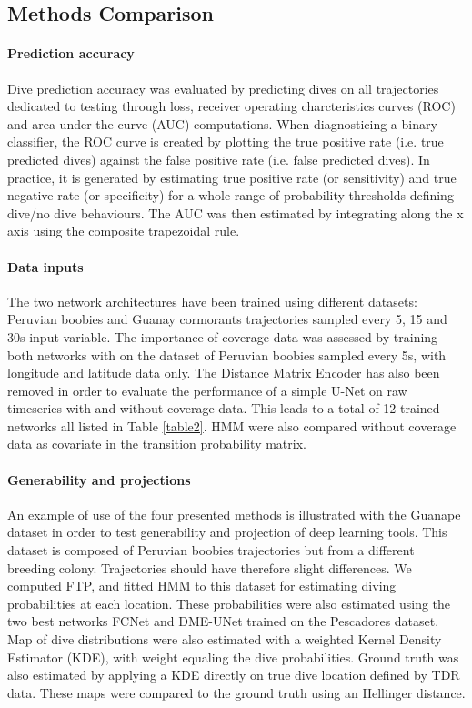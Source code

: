 \documentclass{article}
\begin{document}
\subsection{Methods Comparison}
\paragraph{Prediction accuracy}
Dive prediction accuracy was evaluated by predicting dives on all trajectories dedicated to testing through loss, receiver operating charcteristics curves (ROC) and area under the curve (AUC) computations.
When diagnosticing a binary classifier, the ROC curve is created by plotting the true positive rate (i.e. true predicted dives) against the false positive rate (i.e. false predicted dives).
In practice, it is generated by estimating true positive rate (or sensitivity) and true negative rate (or specificity) for a whole range of probability thresholds defining dive/no dive behaviours.
The AUC was then estimated by integrating along the x axis using the composite trapezoidal rule.

\paragraph{Data inputs}
The two network architectures have been trained using different datasets: Peruvian boobies and Guanay cormorants trajectories sampled every 5, 15 and 30s  input variable.
The importance of coverage data was assessed by training both networks with on the dataset of Peruvian boobies sampled every 5s, with longitude and latitude data only.
The Distance Matrix Encoder has also been removed in order to evaluate the performance of a simple U-Net on raw timeseries with and without coverage data.
This leads to a total of 12 trained networks all listed in Table \ref{table2}.
HMM were also compared without coverage data as covariate in the transition probability matrix.

\paragraph{Generability and projections}
An example of use of the four presented methods is illustrated with the Guanape dataset in order to test generability and projection of deep learning tools. This dataset is composed of Peruvian boobies trajectories but from a different breeding colony.
Trajectories should have therefore slight differences.
We computed FTP, and fitted HMM to this dataset for estimating diving probabilities at each location. These probabilities were also estimated using the two best networks FCNet and DME-UNet trained on the Pescadores dataset.
Map of dive distributions were also estimated with a weighted Kernel Density Estimator (KDE), with weight equaling the dive probabilities.
Ground truth was also estimated by applying a KDE directly on true dive location defined by TDR data.
These maps were compared to the ground truth using an Hellinger distance.
\end{document}
